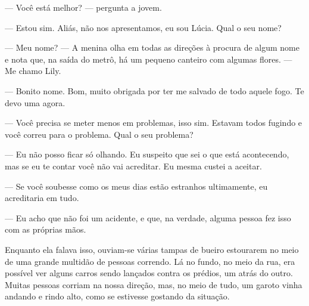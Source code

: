 — Você está melhor? — pergunta a jovem.

— Estou sim. Aliás, não nos apresentamos, eu sou Lúcia. Qual o seu nome?

— Meu nome? — A menina olha em todas as direções à procura de algum nome e nota que, na saída do metrô, há um pequeno canteiro com algumas flores. — Me chamo Lily.

— Bonito nome. Bom, muito obrigada por ter me salvado de todo aquele fogo. Te devo uma agora.

— Você precisa se meter menos em problemas, isso sim. Estavam todos fugindo e você correu para o problema. Qual o seu problema?

— Eu não posso ficar só olhando. Eu suspeito que sei o que está acontecendo, mas se eu te contar você não vai acreditar. Eu mesma custei a aceitar.

— Se você soubesse como os meus dias estão estranhos ultimamente, eu acreditaria em tudo.

— Eu acho que não foi um acidente, e que, na verdade, alguma pessoa fez isso com as próprias mãos.

Enquanto ela falava isso, ouviam-se várias tampas de bueiro estourarem no meio de uma grande multidão de pessoas correndo. Lá no fundo, no meio da rua, era possível ver alguns carros sendo lançados contra os prédios, um atrás do outro. Muitas pessoas corriam na nossa direção, mas, no meio de tudo, um garoto vinha andando e rindo alto, como se estivesse gostando da situação.
